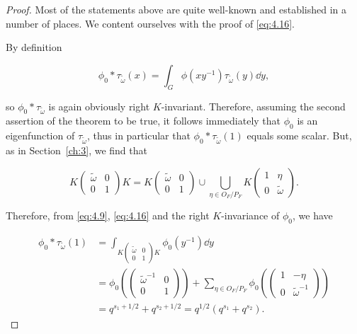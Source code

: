 \begin{proof}

Most of the statements above are quite well-known and established in a number of places. We content ourselves with the proof of \eqref{eq:4.16}.

By definition

\[
\phi_0 * \tau_{\widetilde{\omega}}(x) = \int_G \phi(xy^{-1})\tau_{\widetilde{\omega}}(y)\dd y,
\]

so $\phi_0 * \tau_{\widetilde{\omega}}$ is again obviously right $K$-invariant. Therefore, assuming the second assertion of the theorem to be true, it follows immediately that $\phi_0$ is an eigenfunction of $\tau_{\widetilde{\omega}}$, thus in particular that $\phi_0 * \tau_{\widetilde{\omega}}(1)$ equals some scalar. But, as in Section~\ref{ch:3}, we find that

\begin{equation}\label{eq:4.17}
K\begin{pmatrix} \widetilde{\omega} & 0 \\ 0 & 1 \end{pmatrix}K = K\begin{pmatrix} \widetilde{\omega} & 0 \\ 0 & 1 \end{pmatrix} \cup \bigcup_{\eta \in O_F/P_F} K\begin{pmatrix} 1 & \eta \\ 0 & \widetilde{\omega} \end{pmatrix}.\tag{4.17}
\end{equation}

Therefore, from \eqref{eq:4.9}, \eqref{eq:4.16} and the right $K$-invariance of $\phi_0$, we have

\[
\begin{aligned}
\phi_0 * \tau_{\widetilde{\omega}}(1) &= \int_{K\begin{pmatrix} \widetilde{\omega} & 0 \\ 0 & 1 \end{pmatrix}K} \phi_0(y^{-1})\dd y\\
&= \phi_0\!\left(\begin{pmatrix} \widetilde{\omega}^{-1} & 0 \\ 0 & 1 \end{pmatrix}\right) + \sum_{\eta \in O_F/P_F} \phi_0\!\left(\begin{pmatrix} 1 & -\eta \\ 0 & \widetilde{\omega}^{-1} \end{pmatrix}\right)\\
&= q^{s_1+1/2} + q^{s_2+1/2} = q^{1/2}(q^{s_1} + q^{s_2}).
\end{aligned}
\]

\end{proof}

